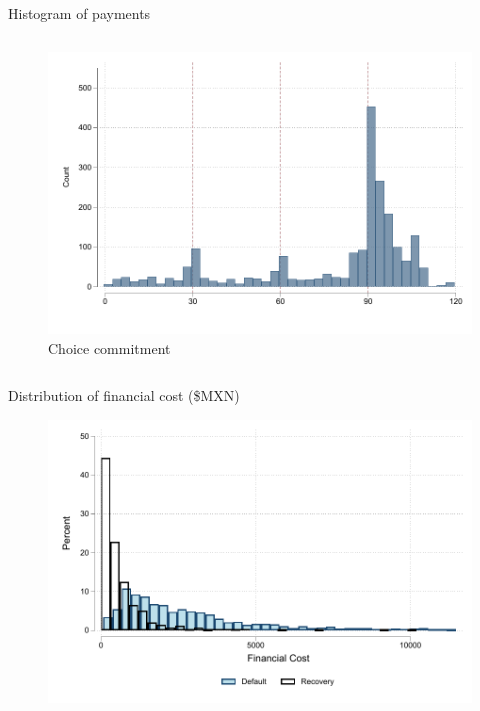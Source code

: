 \documentclass[8pt]{beamer}
\begin{document}
\begin{frame}{Histogram of payments}
\begin{columns}
\begin{column}{.33\textwidth}
    \begin{figure}[H]
    \caption{Choice commitment}
    \begin{center}
        \includegraphics[width=\textwidth]{Figuras/hist_payments_cc.pdf}
    \end{center}
\end{figure}
\end{column}
\end{columns}


    
    \hyperlink{treatment_arms}{}
\end{frame}



\begin{frame}{Distribution of financial cost (\$MXN)}
    \begin{figure}
     \centering
        \includegraphics[width=.8\textwidth]{Figuras/hist_fc.pdf}
    \end{figure}
    
    \hyperlink{fc_outcome}{}

\end{frame}
\end{document}
